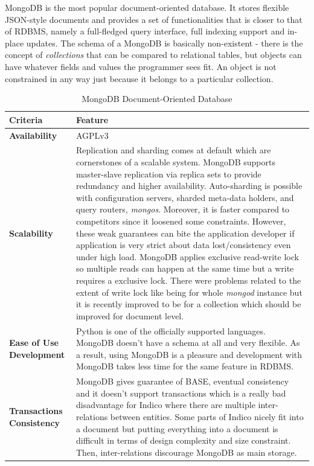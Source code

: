 MongoDB is the most popular document-oriented database.
It stores flexible JSON-style documents and provides a set of functionalities that is closer to that of RDBMS, namely a full-fledged query interface, full indexing support and in-place updates.
The schema of a MongoDB is basically non-existent - there is the concept of \textit{collections} that can be compared to relational tables, but objects can have whatever fields and values the programmer sees fit. An object is not constrained in any way just because it belongs to a particular collection.

\begin{table}[!ht]
  \centering
  \caption{MongoDB Document-Oriented Database}
  \renewcommand{\arraystretch}{1.5}
  \begin{tabular}{| >{\centering\bfseries}m{1in} | >{\centering\arraybackslash}m{4.5in} |}
	\hline
    \textbf{Criteria} & \textbf{Feature} \\
	\hline
    Availability &
    AGPLv3\\ \hline
    Scalability &
    Replication and sharding comes at default which are cornerstones of a scalable system. MongoDB supports master-slave replication via replica sets to provide redundancy and higher availability.
    Auto-sharding is possible with configuration servers, sharded meta-data holders, and query routers, \textit{mongos}.
    Moreover, it is faster compared to competitors since it loosened some constraints. However, these weak guarantees can bite the application developer if application is very strict about data lost/consistency even under high load.
    MongoDB applies exclusive read-write lock so multiple reads can happen at the same time but a write requires a exclusive lock. There were problems related to the extent of write lock like being for whole \textit{mongod} instance but it is recently improved to be for a collection which should be improved for document level.
    \\ \hline
    Ease of Use Development &
    Python is one of the officially supported languages.
    MongoDB doesn't have a schema at all and very flexible. As a result, using MongoDB is a pleasure and development with MongoDB takes less time for the same feature in RDBMS.
    \\ \hline
    Transactions Consistency &
    MongoDB gives guarantee of BASE, eventual consistency and it doesn't support transactions which is a really bad disadvantage for Indico where there are multiple inter-relations between entities. Some parts of Indico nicely fit into a document but putting everything into a document is difficult in terms of design complexity and size constraint. Then, inter-relations discourage MongoDB as main storage.

\end{tabular}
\end{table}
